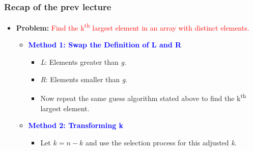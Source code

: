 \begin{frame}
    \frametitle{Recap of the prev lecture}
    \vspace{0.3cm} %
    \begin{itemize}
        \item \textbf{Problem:} \textcolor{red}{Find the k\textsuperscript{th} largest element in an array with distinct elements.}
        \vspace{0.3cm} %
        \vspace{0.2cm} %
        \begin{itemize}
            \item \textcolor{blue}{\textbf{Method 1: Swap the Definition of L and R}}
            \begin{itemize}
                \item \textit{L}: Elements greater than  \textit{g}.
                \item \textit{R}: Elements smaller than \textit{g}.
                \item Now repeat the same guess algorithm stated above to find the k\textsuperscript{th} largest element.
            \end{itemize}
            \vspace{0.3cm}
            \item \textcolor{blue}{\textbf{Method 2: Transforming k}}
            \begin{itemize}
                \item Let $k = n - k$ and use the selection process for this adjusted \textit{k}.
            \end{itemize}
        \end{itemize}
    \end{itemize}
    \vspace{0.5cm} %
\end{frame}



